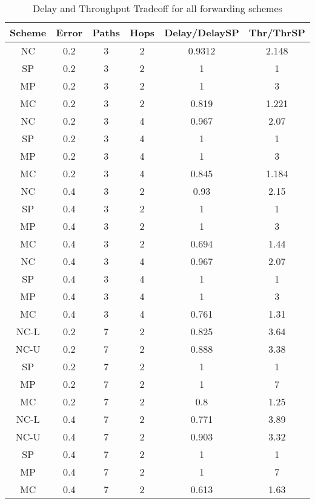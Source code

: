 \documentclass[journal, onecolumn, 12pt]{IEEEtran}
\begin{document}
\begin{table}[ht]
\centering
\begin{tabular}{c c c c c c}
\hline\hline
Scheme & Error & Paths & Hops & Delay/DelaySP & Thr/ThrSP\\ [0.5ex]
\hline
NC & 0.2 & 3 & 2 & 0.9312 & 2.148  \\
SP & 0.2 & 3 & 2 & 1 & 1  \\
MP & 0.2 & 3 & 2 & 1 & 3 \\
MC & 0.2 & 3 & 2 & 0.819 & 1.221 \\ [1ex]


NC & 0.2 & 3 & 4 & 0.967 & 2.07  \\
SP & 0.2 & 3 & 4 & 1 & 1  \\
MP & 0.2 & 3 & 4 & 1 & 3 \\
MC & 0.2 & 3 & 4 & 0.845 & 1.184 \\ [1ex]


NC & 0.4 & 3 & 2 & 0.93 & 2.15  \\
SP & 0.4 & 3 & 2 & 1 & 1  \\
MP & 0.4 & 3 & 2 & 1 & 3 \\
MC & 0.4 & 3 & 2 & 0.694 & 1.44 \\ [1ex]


NC & 0.4 & 3 & 4 & 0.967 & 2.07  \\
SP & 0.4 & 3 & 4 & 1 & 1  \\
MP & 0.4 & 3 & 4 & 1 & 3 \\
MC & 0.4 & 3 & 4 & 0.761 & 1.31 \\ [1ex]


NC-L & 0.2 & 7 & 2 & 0.825 & 3.64  \\
NC-U & 0.2 & 7 & 2 & 0.888 & 3.38  \\
SP & 0.2 & 7 & 2 & 1 &  1  \\
MP & 0.2 & 7 & 2 & 1 & 7 \\
MC & 0.2 & 7 & 2 & 0.8 & 1.25 \\ [1ex]


NC-L & 0.4 & 7 & 2 & 0.771 & 3.89  \\
NC-U & 0.4 & 7 & 2 & 0.903 & 3.32  \\
SP & 0.4 & 7 & 2 & 1 &  1  \\
MP & 0.4 & 7 & 2 & 1 & 7 \\
MC & 0.4 & 7 & 2 & 0.613 & 1.63 \\ [1ex]
\hline
\end{tabular}
\caption{Delay and Throughput Tradeoff for all forwarding schemes}
\label{table:trnodedisjoint}
\end{table}
\end{document}
